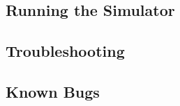 \documentclass[letterpaper, 11pt, twoside]{article}
\begin{document}
\subsection[Simulator Command]{Running the Simulator}
\paragraph{}


\subsection{Troubleshooting}
\paragraph{}

\subsection{Known Bugs}
\paragraph{}

\clearpage

\end{document}
